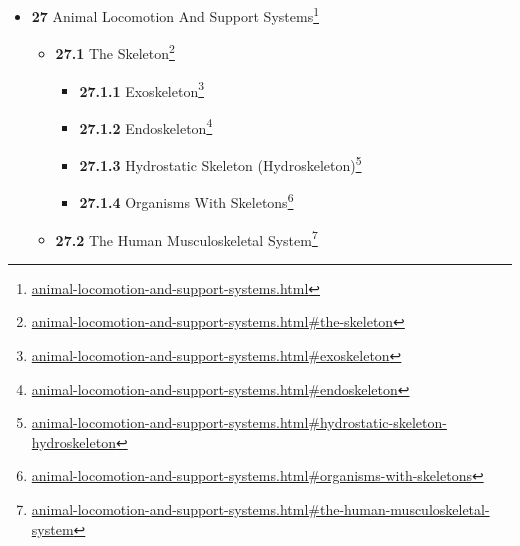 \documentclass[
]{article}
\providecommand{\tightlist}{%
  \setlength{\itemsep}{0pt}\setlength{\parskip}{0pt}}
\providecommand{\tightlist}{%
  \setlength{\itemsep}{0pt}\setlength{\parskip}{0pt}}
\let\rmarkdownfootnote\footnote%
\def\footnote{\protect\rmarkdownfootnote}
\renewcommand{\href}[2]{#2\footnote{\url{#1}}}
\theoremstyle{definition}
\theoremstyle{definition}
\theoremstyle{definition}
\theoremstyle{remark}
\begin{document}
\begin{itemize}
\begin{itemize}
    \begin{itemize}
    \tightlist
    \item
      \href{sensation-receptors-organs-and-systems.html\#the-tongue-1}{\emph{}\textbf{26.8.1}
      The Tongue}
    \item
      \href{sensation-receptors-organs-and-systems.html\#the-five-basic-tastes}{\emph{}\textbf{26.8.2}
      The Five Basic Tastes}
    \item
      \href{sensation-receptors-organs-and-systems.html\#sweetness}{\emph{}\textbf{26.8.3}
      Sweetness}
    \item
      \href{sensation-receptors-organs-and-systems.html\#sourness}{\emph{}\textbf{26.8.4}
      Sourness}
    \item
      \href{sensation-receptors-organs-and-systems.html\#saltiness}{\emph{}\textbf{26.8.5}
      Saltiness}
    \item
      \href{sensation-receptors-organs-and-systems.html\#bitterness}{\emph{}\textbf{26.8.6}
      Bitterness}
    \item
      \href{sensation-receptors-organs-and-systems.html\#savoriness-umami}{\emph{}\textbf{26.8.7}
      Savoriness (Umami)}
    \item
      \href{sensation-receptors-organs-and-systems.html\#the-taste-receptors}{\emph{}\textbf{26.8.8}
      The Taste Receptors}
    \item
      \href{sensation-receptors-organs-and-systems.html\#the-gustatory-cortex}{\emph{}\textbf{26.8.9}
      The Gustatory Cortex}
    \end{itemize}
  \end{itemize}
\item
  \href{animal-locomotion-and-support-systems.html}{\emph{}\textbf{27}
  Animal Locomotion And Support Systems}

  \begin{itemize}
  \tightlist
  \item
    \href{animal-locomotion-and-support-systems.html\#the-skeleton}{\emph{}\textbf{27.1}
    The Skeleton}

    \begin{itemize}
    \tightlist
    \item
      \href{animal-locomotion-and-support-systems.html\#exoskeleton}{\emph{}\textbf{27.1.1}
      Exoskeleton}
    \item
      \href{animal-locomotion-and-support-systems.html\#endoskeleton}{\emph{}\textbf{27.1.2}
      Endoskeleton}
    \item
      \href{animal-locomotion-and-support-systems.html\#hydrostatic-skeleton-hydroskeleton}{\emph{}\textbf{27.1.3}
      Hydrostatic Skeleton (Hydroskeleton)}
    \item
      \href{animal-locomotion-and-support-systems.html\#organisms-with-skeletons}{\emph{}\textbf{27.1.4}
      Organisms With Skeletons}
    \end{itemize}
  \item
    \href{animal-locomotion-and-support-systems.html\#the-human-musculoskeletal-system}{\emph{}\textbf{27.2}
    The Human Musculoskeletal System}


\end{itemize}
\end{itemize}
\end{document}
